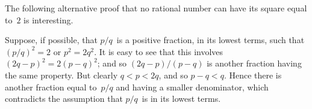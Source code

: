 \documentclass{article}
\begin{document}
\begin{remark}\label{hardy-square}
The following alternative proof that no rational number can have its
square equal to~$2$ is interesting.

Suppose, if possible, that $p/q$~is a positive fraction, in its lowest terms,
such that $(p/q)^{2} = 2$ or $p^{2} = 2q^{2}$. It is easy to see that this involves
$(2q - p)^{2} = 2(p - q)^{2}$; and so $(2q - p)/(p - q)$ is another fraction having the
same property. But clearly $q < p < 2q$, and so $p - q < q$. Hence there is
another fraction equal to~$p/q$ and having a smaller denominator, which
contradicts the assumption that $p/q$~is in its lowest terms.
\end{remark}
\end{document}
